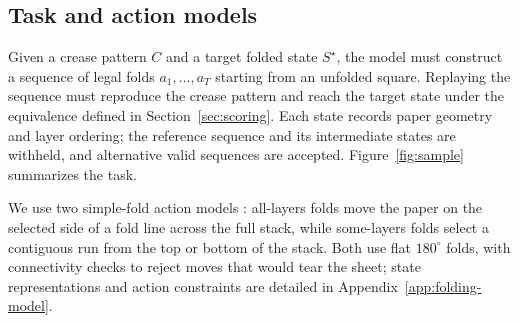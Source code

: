\subsection{Task and action models}
\label{sec:problem}
\label{sec:problem-task}

Given a crease pattern $C$ and a target folded state $S^\star$, the model must construct a
sequence of legal folds $a_1,\ldots,a_T$ starting from an unfolded square. Replaying the sequence
must reproduce the crease pattern and reach the target state under the equivalence defined in
Section~\ref{sec:scoring}. Each state records paper geometry and layer ordering; the reference
sequence and its intermediate states are withheld, and alternative valid sequences are accepted.
Figure~\ref{fig:sample} summarizes the task.

We use two simple-fold action models \citep{arkin-map}: all-layers folds move the paper on the
selected side of a fold line across the full stack, while some-layers folds select a contiguous
run from the top or bottom of the stack. Both use flat $180^\circ$ folds, with connectivity checks
to reject moves that would tear the sheet; state representations and action constraints are
detailed in Appendix~\ref{app:folding-model}.


